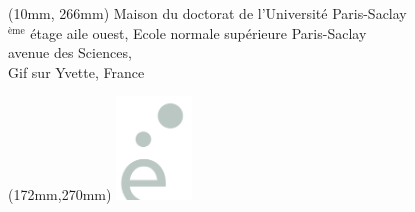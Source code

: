 \begin{singlespace}
\begin{center}
\end{center}

\vspace*{-10mm}

\begin{center}
\end{center}

\begin{textblock*}{161mm}(10mm, 266mm)
\color{bordeau}
\noindent Maison du doctorat de l’Université Paris-Saclay \\
$^\text{ème}$ étage aile ouest, Ecole normale supérieure Paris-Saclay \\   
 avenue des Sciences, \\
 Gif sur Yvette, France
\end{textblock*}

\begin{textblock*}{0mm}(172mm,270mm)
\includegraphics[width=20mm]{media/UPSACLAY-petit}
\end{textblock*}
\end{singlespace}
